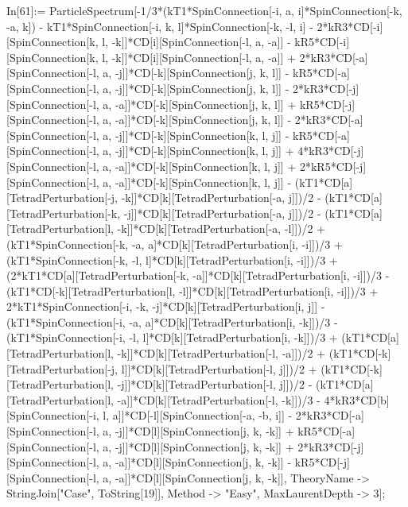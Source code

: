 In[61]:= ParticleSpectrum[-1/3*(kT1*SpinConnection[-i, a, i]*SpinConnection[-k, -a, k]) - kT1*SpinConnection[-i, k, l]*SpinConnection[-k, -l, i] - 2*kR3*CD[-i][SpinConnection[k, l, -k]]*CD[i][SpinConnection[-l, a, -a]] - kR5*CD[-i][SpinConnection[k, l, -k]]*CD[i][SpinConnection[-l, a, -a]] + 2*kR3*CD[-a][SpinConnection[-l, a, -j]]*CD[-k][SpinConnection[j, k, l]] - kR5*CD[-a][SpinConnection[-l, a, -j]]*CD[-k][SpinConnection[j, k, l]] - 2*kR3*CD[-j][SpinConnection[-l, a, -a]]*CD[-k][SpinConnection[j, k, l]] + kR5*CD[-j][SpinConnection[-l, a, -a]]*CD[-k][SpinConnection[j, k, l]] - 2*kR3*CD[-a][SpinConnection[-l, a, -j]]*CD[-k][SpinConnection[k, l, j]] - kR5*CD[-a][SpinConnection[-l, a, -j]]*CD[-k][SpinConnection[k, l, j]] + 4*kR3*CD[-j][SpinConnection[-l, a, -a]]*CD[-k][SpinConnection[k, l, j]] + 2*kR5*CD[-j][SpinConnection[-l, a, -a]]*CD[-k][SpinConnection[k, l, j]] - (kT1*CD[a][TetradPerturbation[-j, -k]]*CD[k][TetradPerturbation[-a, j]])/2 - (kT1*CD[a][TetradPerturbation[-k, -j]]*CD[k][TetradPerturbation[-a, j]])/2 - (kT1*CD[a][TetradPerturbation[l, -k]]*CD[k][TetradPerturbation[-a, -l]])/2 + (kT1*SpinConnection[-k, -a, a]*CD[k][TetradPerturbation[i, -i]])/3 + (kT1*SpinConnection[-k, -l, l]*CD[k][TetradPerturbation[i, -i]])/3 + (2*kT1*CD[a][TetradPerturbation[-k, -a]]*CD[k][TetradPerturbation[i, -i]])/3 - (kT1*CD[-k][TetradPerturbation[l, -l]]*CD[k][TetradPerturbation[i, -i]])/3 + 2*kT1*SpinConnection[-i, -k, -j]*CD[k][TetradPerturbation[i, j]] - (kT1*SpinConnection[-i, -a, a]*CD[k][TetradPerturbation[i, -k]])/3 - (kT1*SpinConnection[-i, -l, l]*CD[k][TetradPerturbation[i, -k]])/3 + (kT1*CD[a][TetradPerturbation[l, -k]]*CD[k][TetradPerturbation[-l, -a]])/2 + (kT1*CD[-k][TetradPerturbation[-j, l]]*CD[k][TetradPerturbation[-l, j]])/2 + (kT1*CD[-k][TetradPerturbation[l, -j]]*CD[k][TetradPerturbation[-l, j]])/2 - (kT1*CD[a][TetradPerturbation[l, -a]]*CD[k][TetradPerturbation[-l, -k]])/3 - 4*kR3*CD[b][SpinConnection[-i, l, a]]*CD[-l][SpinConnection[-a, -b, i]] - 2*kR3*CD[-a][SpinConnection[-l, a, -j]]*CD[l][SpinConnection[j, k, -k]] + kR5*CD[-a][SpinConnection[-l, a, -j]]*CD[l][SpinConnection[j, k, -k]] + 2*kR3*CD[-j][SpinConnection[-l, a, -a]]*CD[l][SpinConnection[j, k, -k]] - kR5*CD[-j][SpinConnection[-l, a, -a]]*CD[l][SpinConnection[j, k, -k]], TheoryName -> StringJoin["Case", ToString[19]], Method -> "Easy", MaxLaurentDepth -> 3]; 